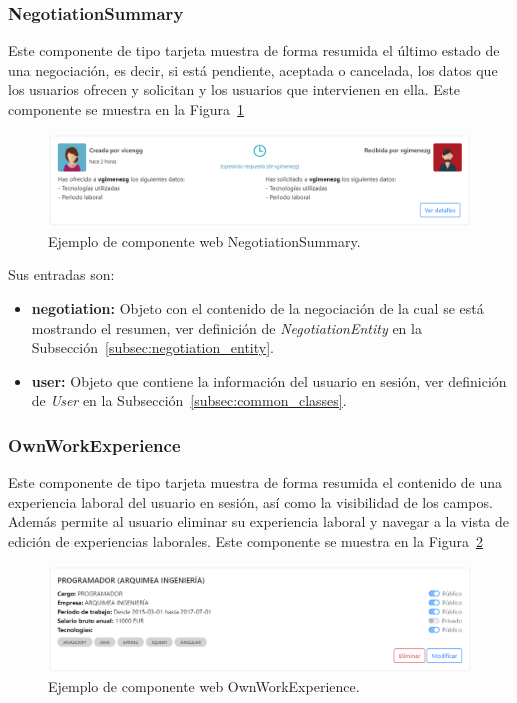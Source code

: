 \documentclass[a4paper, 12pt]{book}
\begin{document}
\subsubsection{NegotiationSummary}
\label{subsec:wc_negotiation_summary}
Este componente de tipo tarjeta muestra de forma resumida el último estado de una negociación, es decir, si está pendiente, aceptada o cancelada, los datos que los usuarios ofrecen y solicitan y los usuarios que intervienen en ella.
Este componente se muestra en la Figura~\ref{fig:component_negotiation_summary}

\begin{figure}
  \centering
  \includegraphics[width=15cm, keepaspectratio]{img/NegotiationSummary.PNG}
  \caption{Ejemplo de componente web NegotiationSummary.}\label{fig:component_negotiation_summary}
\end{figure}

Sus entradas son:

		\begin{itemize}
		\item \textbf{negotiation:} Objeto con el contenido de la negociación de la cual se está mostrando el resumen, ver definición de \emph{NegotiationEntity} en la Subsección~\ref{subsec:negotiation_entity}.
		\item \textbf{user:} Objeto que contiene la información del usuario en sesión, ver definición de \emph{User} en la Subsección~\ref{subsec:common_classes}.
		\end{itemize}


\subsubsection{OwnWorkExperience}
\label{subsec:wc_own_work_experience}
Este componente de tipo tarjeta muestra de forma resumida el contenido de una experiencia laboral del usuario en sesión, así como la visibilidad de los campos. Además permite al usuario eliminar su experiencia laboral y navegar a la vista de edición de experiencias laborales.
Este componente se muestra en la Figura~\ref{fig:component_own_work_experience}

\begin{figure}
  \centering
  \includegraphics[width=15cm, keepaspectratio]{img/OwnWorkExperience.PNG}
  \caption{Ejemplo de componente web OwnWorkExperience.}\label{fig:component_own_work_experience}
\end{figure}
\end{document}
